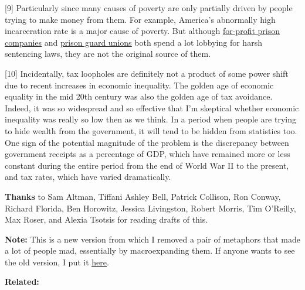 [9] Particularly since many causes of poverty are only
                  partially driven by people trying to make money from them. For
                  example, America's abnormally high incarceration rate is a
                  major cause of poverty. But although
                  \href{https://www.washingtonpost.com/posteverything/wp/2015/04/28/how-for-profit-prisons-have-become-the-biggest-lobby-no-one-is-talking-about/}{\underline{for-profit prison companies}}
                  and
                  \href{http://mic.com/articles/41531/union-of-the-snake-how-california-s-prison-guards-subvert-democracy}{\underline{prison guard unions}}
                  both spend a lot lobbying for harsh sentencing laws, they are
                  not the original source of them.

[10] Incidentally, tax loopholes are definitely not a product of
                  some power shift due to recent increases in economic
                  inequality. The golden age of economic equality in the mid
                  20th century was also the golden age of tax avoidance. Indeed,
                  it was so widespread and so effective that I'm skeptical
                  whether economic inequality was really so low then as we
                  think. In a period when people are trying to hide wealth from
                  the government, it will tend to be hidden from statistics too.
                  One sign of the potential magnitude of the problem is the
                  discrepancy between government receipts as a percentage of
                  GDP, which have remained more or less constant during the
                  entire period from the end of World War II to the present, and
                  tax rates, which have varied dramatically.


                  \textbf{Thanks} to Sam Altman, Tiffani Ashley Bell, Patrick
                  Collison, Ron Conway, Richard Florida, Ben Horowitz, Jessica
                  Livingston, Robert Morris, Tim O'Reilly, Max Roser, and Alexia
                  Tsotsis for reading drafts of this.

\textbf{Note:}
                  This is a new version from which I removed a pair of metaphors
                  that made a lot of people mad, essentially by macroexpanding
                  them. If anyone wants to see the old version, I put it
                  \href{http://www.paulgraham.com/ineqold.html}{\underline{here}}.



\textbf{Related:}


              
            
          
